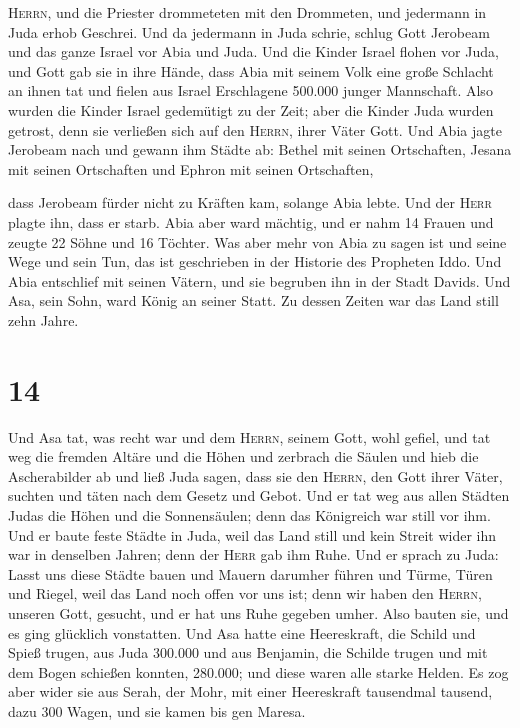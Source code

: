 \textsc{Herrn}, und die Priester drommeteten mit den Drommeten,
 und jedermann in Juda erhob Geschrei. Und da jedermann
in Juda schrie, schlug Gott Jerobeam und das ganze Israel vor Abia und
Juda.  Und die Kinder Israel flohen vor Juda, und Gott
gab sie in ihre Hände,  dass Abia mit seinem Volk eine
große Schlacht an ihnen tat und fielen aus Israel Erschlagene 500.000
junger Mannschaft.  Also wurden die Kinder Israel
gedemütigt zu der Zeit; aber die Kinder Juda wurden getrost, denn sie
verließen sich auf den \textsc{Herrn}, ihrer Väter Gott. 
Und Abia jagte Jerobeam nach und gewann ihm Städte ab: Bethel mit seinen
Ortschaften, Jesana mit seinen Ortschaften und Ephron mit seinen
Ortschaften,

 dass Jerobeam fürder nicht zu Kräften kam, solange Abia
lebte. Und der \textsc{Herr} plagte ihn, dass er starb. 
Abia aber ward mächtig, und er nahm 14 Frauen und zeugte 22 Söhne und 16
Töchter.  Was aber mehr von Abia zu sagen ist und seine
Wege und sein Tun, das ist geschrieben in der Historie des Propheten
Iddo.  Und Abia entschlief mit seinen Vätern, und sie
begruben ihn in der Stadt Davids. Und Asa, sein Sohn, ward König an
seiner Statt. Zu dessen Zeiten war das Land still zehn Jahre.

\hypertarget{section-13}{%
\section{14}\label{section-13}}

 Und Asa tat, was recht war und dem \textsc{Herrn}, seinem
Gott, wohl gefiel,  und tat weg die fremden Altäre und die
Höhen und zerbrach die Säulen und hieb die Ascherabilder ab
 und ließ Juda sagen, dass sie den \textsc{Herrn}, den
Gott ihrer Väter, suchten und täten nach dem Gesetz und Gebot.
 Und er tat weg aus allen Städten Judas die Höhen und die
Sonnensäulen; denn das Königreich war still vor ihm.  Und
er baute feste Städte in Juda, weil das Land still und kein Streit wider
ihn war in denselben Jahren; denn der \textsc{Herr} gab ihm Ruhe.
 Und er sprach zu Juda: Lasst uns diese Städte bauen und
Mauern darumher führen und Türme, Türen und Riegel, weil das Land noch
offen vor uns ist; denn wir haben den \textsc{Herrn}, unseren Gott,
gesucht, und er hat uns Ruhe gegeben umher. Also bauten sie, und es ging
glücklich vonstatten.  Und Asa hatte eine Heereskraft, die
Schild und Spieß trugen, aus Juda 300.000 und aus Benjamin, die Schilde
trugen und mit dem Bogen schießen konnten, 280.000; und diese waren alle
starke Helden.  Es zog aber wider sie aus Serah, der Mohr,
mit einer Heereskraft tausendmal tausend, dazu 300 Wagen, und sie kamen
bis gen Maresa.

